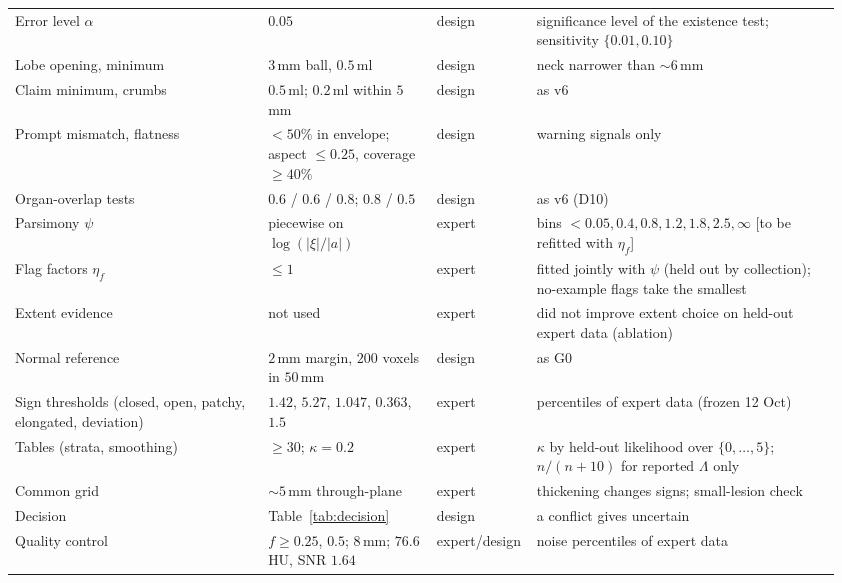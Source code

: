 \documentclass[fleqn,10pt]{olplainarticle}
\begin{document}
\begin{table}[t]
\begin{tabular}{p{0.30\linewidth}p{0.20\linewidth}p{0.10\linewidth}p{0.36\linewidth}}
Error level $\alpha$ & $0.05$ & design & significance level of the existence test; sensitivity $\{0.01,0.10\}$\\
Lobe opening, minimum & $3$\,mm ball, $0.5$\,ml & design & neck narrower than $\sim6$\,mm\\
Claim minimum, crumbs & $0.5$\,ml; $0.2$\,ml within $5$\,mm & design & as v6\\
Prompt mismatch, flatness & $<50\%$ in envelope; aspect $\le0.25$, coverage $\ge40\%$ & design & warning signals only\\
Organ-overlap tests & $0.6$ / $0.6$ / $0.8$; $0.8$ / $0.5$ & design & as v6 (D10)\\
Parsimony $\psi$ & piecewise on $\log(|\xi|/|a|)$ & expert & bins $<0.05,0.4,0.8,1.2,1.8,2.5,\infty$ [to be refitted with $\eta_f$]\\
Flag factors $\eta_f$ & $\le1$ & expert & fitted jointly with $\psi$ (held out by collection); no-example flags take the smallest\\
Extent evidence & not used & expert & did not improve extent choice on held-out expert data (ablation)\\
Normal reference & $2$\,mm margin, $200$ voxels in $50$\,mm & design & as G0\\
Sign thresholds (closed, open, patchy, elongated, deviation) & $1.42$, $5.27$, $1.047$, $0.363$, $1.5$ & expert & percentiles of expert data (frozen 12 Oct)\\
Tables (strata, smoothing) & $\ge30$; $\kappa=0.2$ & expert & $\kappa$ by held-out likelihood over $\{0,\dots,5\}$; $n/(n+10)$ for reported $\Lambda$ only\\
Common grid & $\sim5$\,mm through-plane & expert & thickening changes signs; small-lesion check\\
Decision & Table~\ref{tab:decision} & design & a conflict gives uncertain\\
Quality control & $f\ge0.25$, $0.5$; $8$\,mm; $76.6$\,HU, SNR $1.64$ & expert/design & noise percentiles of expert data\\
\hline
\end{tabular}
\end{table}
\end{document}

